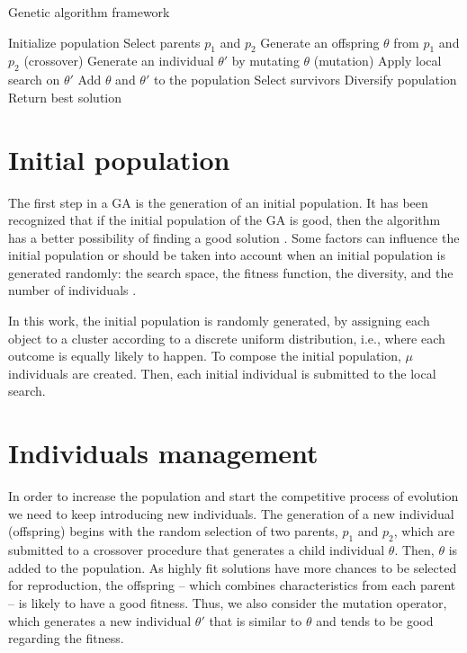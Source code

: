 \begin{algorithm}[H]
\caption{Genetic algorithm framework}
\label{genetic-algo}
\begin{algorithmic}[1]
\STATE Initialize population
\STATE Select parents $p_1$ and $p_2$
\STATE Generate an offspring $\theta$ from $p_1$ and $p_2$ (crossover)
\STATE Generate an individual $\theta'$ by mutating $\theta$ (mutation)
\STATE Apply local search on $\theta'$
\STATE Add $\theta$ and $\theta'$ to the population
\STATE Select survivors
\STATE Diversify population
\ENDIF
\ENDIF
\ENDWHILE
\STATE Return best solution
\end{algorithmic}
\end{algorithm}

\section{Initial population}
The first step in a GA is the generation of an initial population. It has been recognized that if the initial population of the GA is good, then the algorithm has a better possibility of finding a good solution \cite{Burke2004, Zitzler2000}. Some factors can influence the initial population or should be taken into account when an initial population is generated randomly: the search space, the fitness function, the diversity, and the number of individuals \cite{DiazGomez2007}.

In this work, the initial population is randomly generated, by assigning each object to a cluster according to a discrete uniform distribution, i.e., where each outcome is equally likely to happen. To compose the initial population, $\mu$ individuals are created. Then, each initial individual is submitted to the local search.

\section{Individuals management}
In order to increase the population and start the competitive process of evolution we need to keep introducing new individuals. The generation of a new individual (offspring) begins with the random selection of two parents, $p_1$ and $p_2$, which are submitted to a crossover procedure that generates a child individual $\theta$. Then, $\theta$ is added to the population. As highly fit solutions have more chances to be selected for reproduction, the offspring -- which combines characteristics from each parent -- is likely to have a good fitness. Thus, we also consider the mutation operator, which generates a new individual $\theta'$ that is similar to $\theta$ and tends to be good regarding the fitness.

